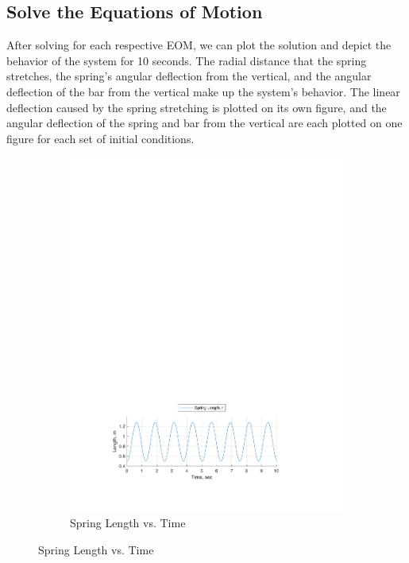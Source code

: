 \documentclass[12pt]{report}
\begin{document}
\begin{flushleft}
\section{Solve the Equations of Motion} \label{section:solve}
After solving for each respective EOM, we can plot the solution and depict the behavior of the system for 10 seconds. The radial distance that the spring stretches, the spring’s angular deflection from the vertical, and the angular deflection of the bar from the vertical make up the system’s behavior. The linear deflection caused by the spring stretching is plotted on its own figure, and the angular deflection of the spring and bar from the vertical are each plotted on one figure for each set of initial conditions.
\begin{figure}[!htp]
  \caption{Numerical Solution Motion Behavior Plot, ($\theta_o:~0,~\phi_o:~0$)}
  \begin{subfigure}[t]{\textwidth}
  \includegraphics[center]{spring_0-0}
  \caption*{Spring Length vs. Time}
  \label{fig:spring:0:0}
\end{subfigure}
\end{figure}


\end{flushleft}
\end{document}
